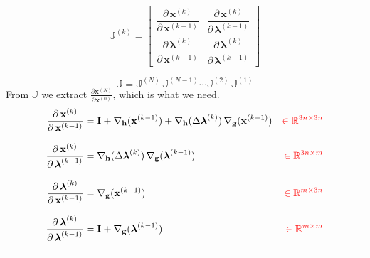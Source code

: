 \documentclass{article}
\newcommand{\pd}[2]{\dfrac{\partial\, #1}{\partial\, #2}}
\newcommand{\pdc}[2]{\frac{\partial #1}{\partial #2}}
\newcommand{\red}[1]{\textcolor{red}{#1}}
\begin{document}
\begin{equation}
\mathbb{J}^{(k)} = 
\begin{bmatrix}
    \pd{\mathbf{x}^{(k)}}{\mathbf{x}^{(k-1)}} &
    \pd{\mathbf{x}^{(k)}}{\boldsymbol{\lambda}^{(k-1)}} \\[1ex]
    \pd{\boldsymbol{\lambda}^{(k)}}{\mathbf{x}^{(k-1)}} &
    \pd{\boldsymbol{\lambda}^{(k)}}{\boldsymbol{\lambda}^{(k-1)}}
\end{bmatrix}
\end{equation}

\begin{equation}
\mathbb{J} = \mathbb{J}^{(N)}\,\mathbb{J}^{(N-1)}\cdots\mathbb{J}^{(2)}\,\mathbb{J}^{(1)}
\end{equation}
From $\mathbb{J}$ we extract $\pdc{\mathbf{x}^{(N)}}{\mathbf{x}^{(0)}}$, which is what we need.
\begin{align}
    \pd{\mathbf{x}^{(k)}}{\mathbf{x}^{(k-1)}} &=
    \mathbf{I} + \nabla_\mathbf{h}(\mathbf{x}^{(k-1)}) + \nabla_\mathbf{h}(\Delta \boldsymbol{\lambda}^{(k)})\,\nabla_\mathbf{g}(\mathbf{x}^{(k-1)}) & 
    \red{\in \mathbb{R}^{3n \times 3n}} \\[2ex]
    \pd{\mathbf{x}^{(k)}}{\boldsymbol{\lambda}^{(k-1)}} &=
    \nabla_\mathbf{h}(\Delta \boldsymbol{\lambda}^{(k)})\,\nabla_\mathbf{g}(\boldsymbol{\lambda}^{(k-1)}) &
    \red{\in \mathbb{R}^{3n \times m}} \\[2ex]
    \pd{\boldsymbol{\lambda}^{(k)}}{\mathbf{x}^{(k-1)}} &= 
    \nabla_\mathbf{g}(\mathbf{x}^{(k-1)}) & 
    \red{\in \mathbb{R}^{m \times 3n}} \\[2ex]
    \pd{\boldsymbol{\lambda}^{(k)}}{\boldsymbol{\lambda}^{(k-1)}} &=
    \mathbf{I} + \nabla_\mathbf{g}(\boldsymbol{\lambda}^{(k-1)}) & 
    \red{\in \mathbb{R}^{m \times m}}
\end{align}

\noindent\rule{\linewidth}{0.4pt}
\vspace{0.5ex}
\end{document}
